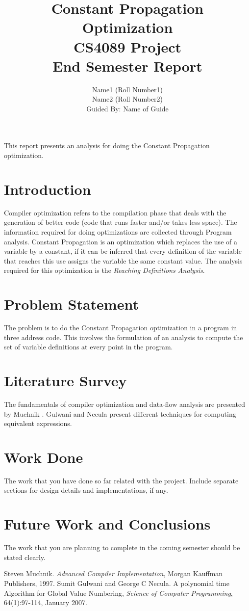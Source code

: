 \documentclass[a4paper,11pt,twocolumn]{article}
\title{Constant Propagation Optimization\\ {\normalsize CS4089 Project\\End Semester Report}}
\author{Name1 (Roll Number1)\\ Name2 (Roll Number2)\\Guided By: Name of Guide}
\begin{document}
\maketitle
\abstract{} 
This report presents an analysis for doing the Constant Propagation optimization. 
\section{Introduction}
Compiler optimization refers to the compilation phase that deals with the  generation of better code (code that runs faster and/or takes less space). The information required for doing optimizations are collected through Program analysis. Constant Propagation is an optimization which replaces the use of a variable by a constant, if it can be inferred that every definition of the variable that reaches this use assigns the variable the same constant value. The analysis required for this optimization is the \textit{Reaching Definitions Analysis}. 
\section{Problem Statement}
The problem is to do the Constant Propagation optimization in a program in three address code. This involves the formulation of an analysis to compute the set of variable definitions at every point in the program.
\section{Literature Survey }
The fundamentals of compiler optimization and data-flow analysis are presented by Muchnik  \cite{much}. Gulwani and Necula \cite{sumit} present different techniques for computing equivalent expressions.
\section{Work Done}
The work that you have done so far related with the project. Include separate sections for design details and implementations, if any. 
\section{Future Work and Conclusions}
The work that you are planning to complete in the coming semester should be stated clearly. 

\begin{thebibliography}{}
Steven Muchnik. \textit{Advanced Compiler Implementation}, Morgan Kauffman Publishers, 1997.
Sumit Gulwani and George C Necula. A polynomial time Algorithm for Global Value Numbering, \textit{Science of Computer Programming}, 64(1):97-114, January 2007.
\end{thebibliography}{}
\end{document}
